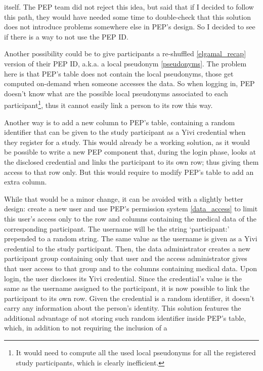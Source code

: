 \documentclass{report}
\begin{document}
itself. The PEP team did not reject this idea, but said that if I decided to follow this path, they would have needed some time to double-check that this solution does not
introduce problems somewhere else in PEP's design. So I decided to see if there is a way to not use the PEP ID.\par 
Another possibility could be to give participants a re-shuffled \ref{elgamal_recap} version of their PEP ID, a.k.a. a local pseudonym \ref{pseudonyms}. The problem here is that
PEP's table does not contain the local pseudonyms, those get computed on-demand when someone accesses the data. So when logging in, PEP doesn't know what are the possible local
pseudonyms associated to each participant\footnote{It would need to compute all the used local pseudonyms for all the registered study participants, which is clearly inefficient.},
thus it cannot easily link a person to its row this way. \par
Another way is to add a new column to PEP's table, containing a random identifier that can be given to the study participant as a Yivi credential when they register for a study.
This would already be a working solution, as it would be possible to write a new PEP component that, during the login phase, looks at the disclosed credential and links the
participant to its own row; thus giving them access to that row only. But this would require to modify PEP's table to add an extra column. \par 
While that would be a minor change,
it can be avoided with a slightly better design: create a new user and use PEP's permission system \ref{data_access} to limit this user's access only to the row and columns containing
the medical data of the corresponding participant. The username will be the string \enquote*{participant:} prepended to a random string. The same value as the username is given as
a Yivi credential to the study participant. Then, the data administrator creates a new participant group containing only that user and the access administrator gives that user
access to that group and to the columns containing medical data. Upon login, the user discloses its Yivi credential. Since the credential's value is the same as the username
assigned to the participant, it is now possible to link the participant to its own row. Given the credential is a random identifier, it doesn't carry any information about the
person's identity. This solution features the additional advantage of not storing such random identifier inside PEP's table, which, in addition to not requiring the inclusion of a
\end{document}
